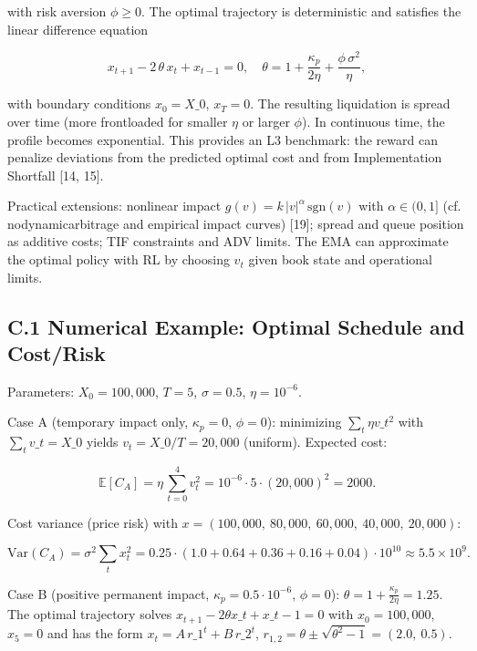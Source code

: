 \documentclass[11pt]{article}
\begin{document}
with risk aversion $\phi\ge 0$. The optimal trajectory is deterministic and satisfies the linear difference equation

\begin{equation}
x_{t+1} - 2\,\theta\,x_t + x_{t-1} = 0,\quad \theta = 1 + \frac{\kappa_p}{2\eta} + \frac{\phi\,\sigma^2}{\eta},
\end{equation}

with boundary conditions $x_0=X\_0$, $x_T=0$. The resulting liquidation is spread over time (more frontloaded for smaller $\eta$ or larger $\phi$). In continuous time, the profile becomes exponential. This provides an L3 benchmark: the reward can penalize deviations from the predicted optimal cost and from Implementation Shortfall [14, 15].

Practical extensions: nonlinear impact $g(v)=k\,|v|^\alpha\,\mathrm{sgn}(v)$ with $\alpha\in(0,1]$ (cf. nodynamicarbitrage and empirical impact curves) [19]; spread and queue position as additive costs; TIF constraints and ADV limits. The EMA can approximate the optimal policy with RL by choosing $v_t$ given book state and operational limits.

\subsection{C.1 Numerical Example: Optimal Schedule and Cost/Risk}

Parameters: $X_0=100,000$, $T=5$, $\sigma=0.5$, $\eta=10^{-6}$.

Case A (temporary impact only, $\kappa_p=0$, $\phi=0$): minimizing $\sum_t \eta v\_t^2$ with $\sum_t v\_t=X\_0$ yields $v_t=X\_0/T=20,000$ (uniform). Expected cost:

\begin{equation}
\mathbb{E}[C_A] = \eta\,\sum_{t=0}^{4} v_t^2 = 10^{-6}\cdot 5 \cdot (20,000)^2 = 2000.
\end{equation}

Cost variance (price risk) with $x=(100,000,\ 80,000,\ 60,000,\ 40,000,\ 20,000)$:

\begin{equation}
\mathrm{Var}(C_A) = \sigma^2\sum_t x_t^2 = 0.25\cdot(1.0+0.64+0.36+0.16+0.04)\cdot 10^{10} \approx 5.5\times 10^9.
\end{equation}

Case B (positive permanent impact, $\kappa_p=0.5\cdot 10^{-6}$, $\phi=0$): $\theta = 1 + \tfrac{\kappa_p}{2\eta} = 1.25$. The optimal trajectory solves $x_{t+1}-2\theta x\_t + x\_{t-1}=0$ with $x_0=100,000$, $x_5=0$ and has the form $x_t = A\,r\_1^t + B\,r\_2^t$, $r_{1,2}=\theta\pm\sqrt{\theta^2-1}=(2.0,\ 0.5)$. 
\end{document}
